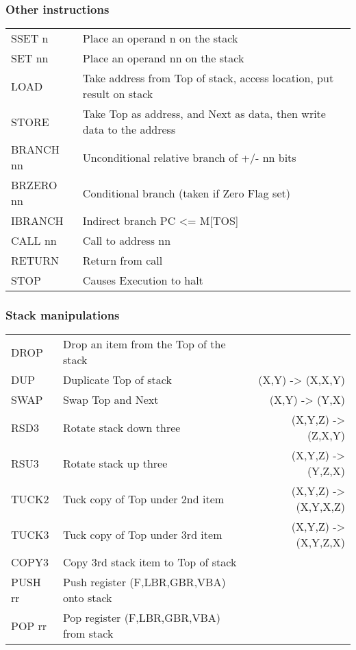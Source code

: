 \subsubsection{Other instructions}
\begingroup
\ttfamily
\begin{tabularx}{0.95\textwidth}{l >{\raggedright\arraybackslash}X}
  SSET n & Place an operand n on the stack \\
  SET nn & Place an operand nn on the stack \\
  LOAD & Take address from Top of stack, access location, put result on stack \\
  STORE & Take Top as address, and Next as data, then write data to the address
  \\
  BRANCH nn & Unconditional relative branch of +/- nn bits \\
  BRZERO nn & Conditional branch (taken if Zero Flag set) \\
  IBRANCH & Indirect branch PC <= M[TOS] \\
  CALL nn & Call to address nn \\
  RETURN & Return from call \\
  STOP & Causes Execution to halt \\
\end{tabularx}
\endgroup

\subsubsection{Stack manipulations}
\begingroup
\ttfamily
\begin{tabularx}{\textwidth}{l >{\raggedright\arraybackslash}X r}
  DROP    & Drop an item from the Top of the stack   & \\
  DUP     & Duplicate Top of stack                   & (X,Y) -> (X,X,Y)     \\
  SWAP    & Swap Top and Next                        & (X,Y) -> (Y,X)       \\
  RSD3    & Rotate stack down three                  & (X,Y,Z) -> (Z,X,Y)   \\
  RSU3    & Rotate stack up three                    & (X,Y,Z) -> (Y,Z,X)   \\
  TUCK2   & Tuck copy of Top under 2nd item          & (X,Y,Z) -> (X,Y,X,Z) \\
  TUCK3   & Tuck copy of Top under 3rd item          & (X,Y,Z) -> (X,Y,Z,X) \\
  COPY3   & Copy 3rd stack item to Top of stack      & \\
  PUSH rr & Push register (F,LBR,GBR,VBA) onto stack & \\
  POP rr  & Pop register (F,LBR,GBR,VBA) from stack  & \\
\end{tabularx}
\endgroup

